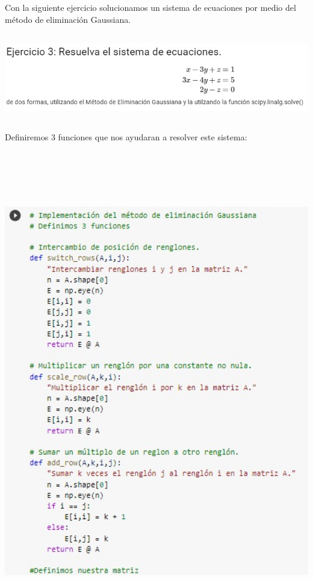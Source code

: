 \documentclass[12pt]{article}
\begin{document}
Con la siguiente ejercicio solucionamos un sistema de ecuaciones por medio del método de eliminación Gaussiana.

    \begin{center}
	\includegraphics[height=3.8cm]{E3.jpeg}\\
    \end{center}
    
Definiremos 3 funciones que nos ayudaran a resolver este sistema:

    \begin{center}
	\includegraphics[height=21cm]{E3.1.jpeg}\\
    \end{center}
    
\end{document}
